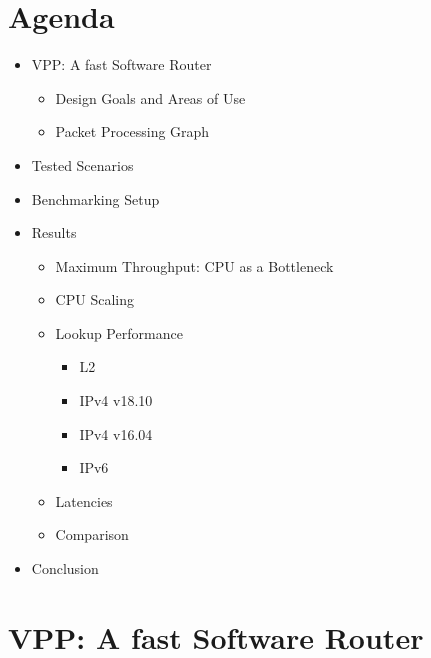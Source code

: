 \section{Agenda}

\begin{frame}
    \begin{itemize}
            \item VPP: A fast Software Router
            \begin{itemize}
                \item Design Goals and Areas of Use
                \item Packet Processing Graph
            \end{itemize}
            \item Tested Scenarios
            \item Benchmarking Setup
            \item Results
            \begin{itemize}
                \item Maximum Throughput: CPU as a Bottleneck
                \item CPU Scaling
                \item Lookup Performance
                \begin{itemize}
                    \item L2
                    \item IPv4 v18.10
                    \item IPv4 v16.04
                    \item IPv6
                \end{itemize}
                \item Latencies
                \item Comparison
            \end{itemize}
            \item Conclusion
        \end{itemize}
\end{frame}

\section{VPP: A fast Software Router}


